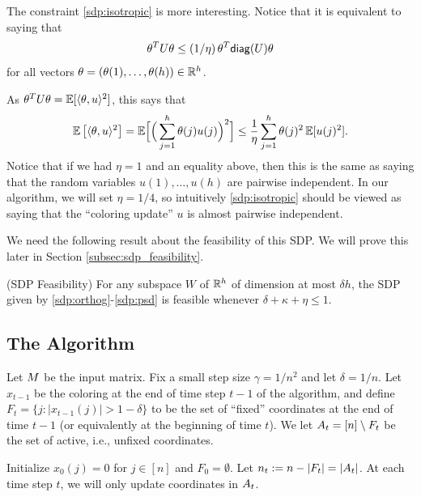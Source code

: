 \medskip

The constraint \eqref{sdp:isotropic} is more interesting. Notice that 
 it is equivalent to saying that \[\theta^T U \theta \leq (1/\eta)\, \theta^T \mathsf{diag} (U) \theta\] for all vectors $\theta = (\theta(1),\ldots,\theta(h)) \in \mathbb{R}^h$.
 
 As $\theta^T U \theta =\mathbb{E}[\langle \theta, u \rangle ^2]$, this says that \[\mathbb{E}\left[\langle \theta, u \rangle ^2 \right] = \mathbb{E} \Big[ \Big(\sum_{j=1}^h \theta(j) u(j)\Big)^2\Big] \leq \frac{1}{\eta} \sum_{j=1}^h \theta(j)^2\, \mathbb{E}[u(j)^2].\]
Notice that if we had $\eta=1$ and an equality above, then this is the same as saying that the random variables $u(1),\ldots,u(h)$ are pairwise independent. In our algorithm, we will set $\eta = 1/4$, so intuitively \eqref{sdp:isotropic} should be viewed as saying that the ``coloring update'' $u$ is almost pairwise independent.


We need the following result about the feasibility of this SDP.
 We will prove this later in
 Section \ref{subsec:sdp_feasibility}.

\begin{theorem}\label{thm:sdp_feasibility}(SDP Feasibility) 
For any subspace $W$ of $\mathbb{R}^h$ of dimension at most $\delta h$, the SDP given by \eqref{sdp:orthog}-\eqref{sdp:psd} is feasible
whenever $\delta + \kappa + \eta \leq 1$. 
\end{theorem}


\subsection{The Algorithm}
\label{subsubsec:alg_bana}
Let $M$ be the input matrix.
Fix a small step size $\gamma = 1/n^2$  and let $\delta = 1/n$. 
 Let $x_{t-1}$ be the coloring at the end of time step $t-1$ of the algorithm, and define $F_{t} = \{j: |x_{t-1}(j)| > 1-\delta\}$ to be the set of ``fixed'' coordinates at the end of time $t-1$ (or equivalently at the beginning of time $t$). We let $A_t = [n]\setminus F_t$ be the set of active, i.e., unfixed coordinates.

Initialize $x_0(j) =0$ for $j\in [n]$
and $F_0= \emptyset$. 
Let $n_t := n-|F_t| = |A_{t}|$.
At each time step $t$, we will only update coordinates in $A_t$.




